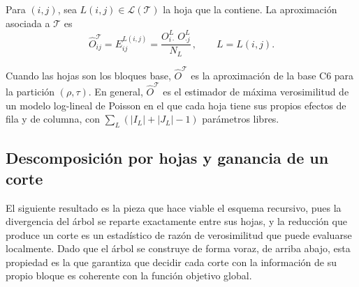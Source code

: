 \begin{definicion}\label{def:aprox-arbol}
Para $(i,j)$, sea $L(i,j)\in\mathcal{L}(\mathcal{T})$ la hoja que la contiene.
La aproximación asociada a $\mathcal{T}$ es
\[
  \hat O^{\mathcal{T}}_{ij} = E^{L(i,j)}_{ij}
  = \frac{O^{L}_{i\cdot}\, O^{L}_{\cdot j}}{N_L}\,,\qquad L = L(i,j).
\]
\end{definicion}

Cuando las hojas son los bloques base, $\hat O^{\mathcal{T}}$ es la
aproximación de la base C6 \cite{Banerjee2007} para la partición $(\rho,\tau)$.
En general, $\hat O^{\mathcal{T}}$ es el estimador de máxima verosimilitud de un
modelo log-lineal de Poisson en el que cada hoja tiene sus propios efectos de
fila y de columna, con $\sum_{L}(|I_L|+|J_L|-1)$ parámetros libres.

\subsection{Descomposición por hojas y ganancia de un corte}\label{sec:prop-descomp}

El siguiente resultado es la pieza que hace viable el esquema recursivo, pues la
divergencia del árbol se reparte exactamente entre sus hojas, y la reducción que
produce un corte es un estadístico de razón de verosimilitud que puede evaluarse
localmente. Dado que el árbol se construye de forma voraz, de arriba abajo, esta
propiedad es la que garantiza que decidir cada corte con la información de su
propio bloque es coherente con la función objetivo global.

